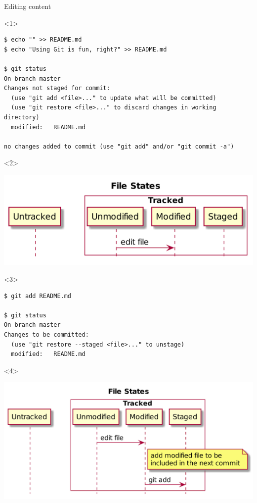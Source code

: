 \documentclass[presentation,aspectratio=169,smaller]{beamer}
\begin{document}
\begin{frame}[label={sec:orgab2a086},fragile]{Editing content}
 \begin{onlyenv}<1>
\begin{verbatim}
$ echo "" >> README.md
$ echo "Using Git is fun, right?" >> README.md

$ git status
On branch master
Changes not staged for commit:
  (use "git add <file>..." to update what will be committed)
  (use "git restore <file>..." to discard changes in working directory)
  modified:   README.md

no changes added to commit (use "git add" and/or "git commit -a")
\end{verbatim}
\end{onlyenv}

\begin{onlyenv}<2>
\begin{center}
\includegraphics[width=.9\linewidth]{images/git-edit-0.png}
\end{center}
\end{onlyenv}

\begin{onlyenv}<3>
\begin{verbatim}
$ git add README.md

$ git status
On branch master
Changes to be committed:
  (use "git restore --staged <file>..." to unstage)
  modified:   README.md
\end{verbatim}
\end{onlyenv}

\begin{onlyenv}<4>
\begin{center}
\includegraphics[width=.9\linewidth]{images/git-edit-1.png}
\end{center}
\end{onlyenv}


\end{frame}
\end{document}
